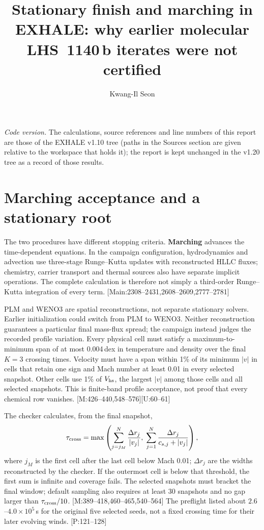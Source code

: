 \documentclass[english,a4paper]{my_memo}
\newcommand{\ev}[2]{\textnormal{\small[#1:#2]}}
\begin{document}
\title{Stationary finish and marching in EXHALE: why earlier molecular
LHS~1140\,b iterates were not certified}
\author{Kwang-Il Seon}
\maketitle

\noindent\textit{Code version.} The calculations, source references and line
numbers of this report are those of the EXHALE v1.10 tree (paths in the
Sources section are given relative to the workspace that holds it); the
report is kept unchanged in the v1.20 tree as a record of those results.

\section{Marching acceptance and a stationary root}

The two procedures have different stopping criteria. \textbf{Marching}
advances the time-dependent equations. In the campaign configuration,
hydrodynamics and advection use three-stage Runge--Kutta updates with
reconstructed HLLC fluxes; chemistry, carrier transport and thermal sources
also have separate implicit operations. The complete calculation is therefore
not simply a third-order Runge--Kutta integration of every term.
\ev{Main}{2308--2431,2608--2609,2777--2781}

PLM and WENO3 are spatial reconstructions, not separate stationary solvers.
Earlier initialization could switch from PLM to WENO3. Neither reconstruction
guarantees a particular final mass-flux spread; the campaign instead judges
the recorded profile variation. Every physical cell must satisfy a
maximum-to-minimum span of at most 0.004\,dex in temperature and density over
the final $K=3$ crossing times. Velocity must have a span within 1\% of its
minimum $|v|$ in cells that retain one sign and Mach number at least 0.01 in
every selected snapshot. Other cells use 1\% of $V_{\rm hs}$, the largest
$|v|$ among those cells and all selected snapshots. This is finite-band
profile acceptance, not proof that every chemical row vanishes.
\ev{M}{426--440,548--576}\ev{U}{60--61}

The checker calculates, from the final snapshot,
\begin{equation}
\tau_{\rm cross}=\max\left(
\sum_{j=j_M}^{N}\frac{\Delta r_j}{|v_j|},\;
\sum_{j=1}^{N}\frac{\Delta r_j}{c_{s,j}+|v_j|}\right),
\end{equation}
where $j_M$ is the first cell after the last cell below Mach 0.01;
$\Delta r_j$ are the widths reconstructed by the checker. If the outermost
cell is below that threshold, the first sum is infinite and coverage fails.
The selected snapshots must bracket the final window; default sampling also
requires at least 30 snapshots and no gap larger than $\tau_{\rm cross}/10$.
\ev{M}{389--418,460--465,540--564}
The preflight listed about $2.6$--$4.0\times10^5$\,s for the original five
selected seeds, not a fixed crossing time for their later evolving winds.
\ev{P}{121--128}
\end{document}
